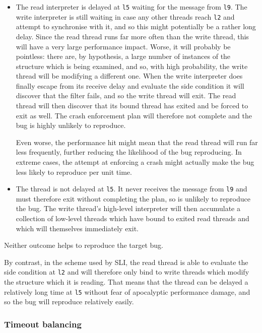 \begin{itemize}
\item
  The read interpreter is delayed at \verb|l5| waiting for the message
  from \verb|l9|.  The write interpreter is still waiting in case any
  other threads reach \verb|l2| and attempt to synchronise with it,
  and so this might potentially be a rather long delay.  Since the
  read thread runs far more often than the write thread, this will
  have a very large performance impact.  Worse, it will probably be
  pointless: there are, by hypothesis, a large number of instances of
  the structure which is being examined, and so, with high
  probability, the write thread will be modifying a different one.
  When the write interpreter does finally escape from its receive
  delay and evaluate the side condition it will discover that the
  filter fails, and so the write thread will exit.  The read thread
  will then discover that its bound thread has exited and be forced to
  exit as well.  The crash enforcement plan will therefore not
  complete and the bug is highly unlikely to reproduce.
  
  Even worse, the performance hit might mean that the read thread will
  run far less frequently, further reducing the likelihood of the bug
  reproducing.  In extreme cases, the attempt at enforcing a crash
  might actually make the bug less likely to reproduce per unit time.
\item
  The thread is not delayed at \verb|l5|.  It never receives the
  message from \verb|l9| and must therefore exit without completing
  the plan, so is unlikely to reproduce the bug.  The write thread's
  high-level interpreter will then accumulate a collection of
  low-level threads which have bound to exited read threads and which
  will themselves immediately exit.
\end{itemize}

Neither outcome helps to reproduce the target bug.

By contrast, in the scheme used by SLI, the read thread is able to
evaluate the side condition at \verb|l2| and will therefore only bind
to write threads which modify the structure which it is reading.  That
means that the thread can be delayed a relatively long time at
\verb|l5| without fear of apocalyptic performance damage, and so the
bug will reproduce relatively easily.

\subsubsection{Timeout balancing}

